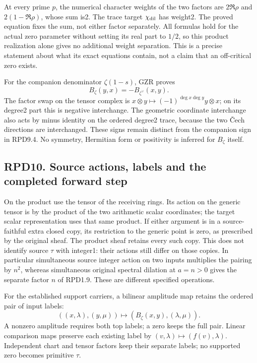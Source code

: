 At every prime \(p\), the numerical character weights of the two factors
are \(2\Re\rho\) and \(2(1-\Re\rho)\), whose sum is2. The trace target
\(\chi_{\rm dil}\) has weight2. The proved equation fixes the sum, not
either factor separately. All formulas hold for the actual zero
parameter without setting its real part to \(1/2\), so this product
realization alone gives no additional weight separation. This is a
precise statement about what its exact equations contain, not a claim
that an off-critical zero exists.

For the companion denominator \(\zeta(1-s)\), GZR proves \[
B_\zeta(y,x)=-B_{\zeta^\vee}(x,y).
\tag{RPD9.4}
\] The factor swap on the tensor complex is
\(x\otimes y\mapsto(-1)^{\deg x\deg y}y\otimes x\); on its degree2 part
this is negative interchange. The geometric coordinate interchange also
acts by minus identity on the ordered degree2 trace, because the two
Čech directions are interchanged. These signs remain distinct from the
companion sign in RPD9.4. No symmetry, Hermitian form or positivity is
inferred for \(B_\zeta\) itself.

\subsection{RPD10. Source actions, labels and the completed forward
step}\label{rpd10.-source-actions-labels-and-the-completed-forward-step}

On the product use the tensor of the receiving rings. Its action on the
generic tensor is by the product of the two arithmetic scalar
coordinates; the target scalar representation uses that same product. If
either argument is in a source-faithful extra closed copy, its
restriction to the generic point is zero, as prescribed by the original
sheaf. The product sheaf retains every such copy. This does not identify
source \(\tau\) with integer1: their actions still differ on those
copies. In particular simultaneous source integer action on two inputs
multiplies the pairing by \(n^2\), whereas simultaneous original
spectral dilation at \(a=n>0\) gives the separate factor \(n\) of
RPD1.9. These are different specified operations.

For the established support carriers, a bilinear amplitude map retains
the ordered pair of input labels: \[
((x,\lambda),(y,\mu))\longmapsto
(B_\zeta(x,y),(\lambda,\mu)).
\] A nonzero amplitude requires both top labels; a zero keeps the full
pair. Linear comparison maps preserve each existing label by
\((v,\lambda)\mapsto(f(v),\lambda)\). Independent chart and tensor
factors keep their separate labels; no supported zero becomes primitive
\(\tau\).

